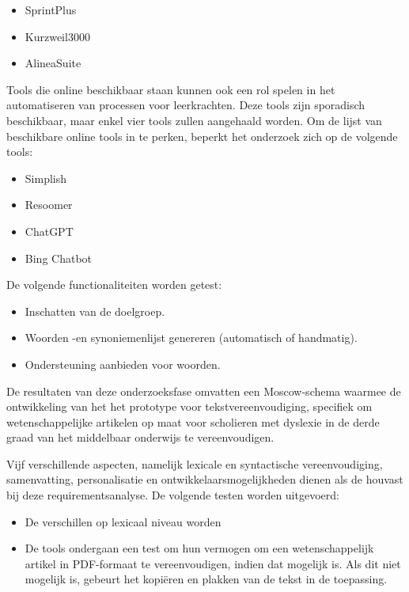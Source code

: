 \begin{itemize}
	\item SprintPlus
	\item Kurzweil3000
	\item AlineaSuite
\end{itemize}

Tools die online beschikbaar staan kunnen ook een rol spelen in het automatiseren van processen voor leerkrachten. Deze tools zijn sporadisch beschikbaar, maar enkel vier tools zullen aangehaald worden. Om de lijst van beschikbare online tools in te perken, beperkt het onderzoek zich op de volgende tools:

\begin{itemize}
	\item Simplish
	\item Resoomer
	\item ChatGPT
	\item Bing Chatbot
\end{itemize}


De volgende functionaliteiten worden getest:

\begin{itemize}
	\item Inschatten van de doelgroep.
	\item Woorden -en synoniemenlijst genereren (automatisch of handmatig).
	\item Ondersteuning aanbieden voor woorden.
\end{itemize}

De resultaten van deze onderzoeksfase omvatten een Moscow-schema waarmee de ontwikkeling van het het prototype voor tekstvereenvoudiging, specifiek om wetenschappelijke artikelen op maat voor scholieren met dyslexie in de derde graad van het middelbaar onderwijs te vereenvoudigen.

\medspace

Vijf verschillende aspecten, namelijk lexicale en syntactische vereenvoudiging, samenvatting, personalisatie en ontwikkelaarsmogelijkheden dienen als de houvast bij deze requirementsanalyse. De volgende testen worden uitgevoerd:

\begin{itemize}
	\item De verschillen op lexicaal niveau worden 

	\item De tools ondergaan een test om hun vermogen om een wetenschappelijk artikel in PDF-formaat te vereenvoudigen, indien dat mogelijk is. Als dit niet mogelijk is, gebeurt het kopiëren en plakken van de tekst in de toepassing.
\end{itemize}

